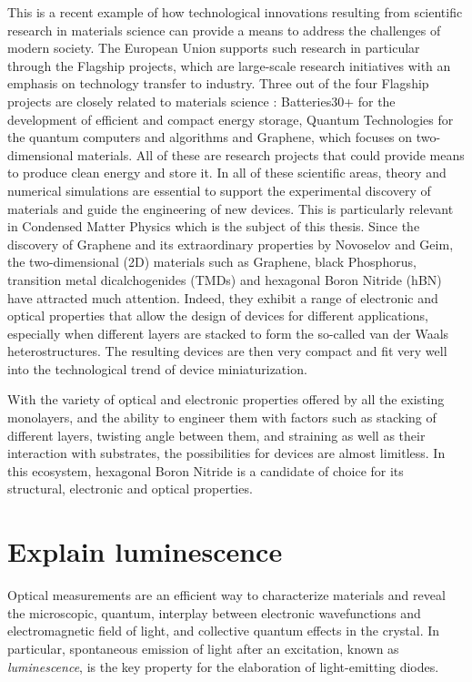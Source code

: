 This is a recent example of how technological innovations resulting from scientific research in materials science can provide a means to address the challenges of modern society. The European Union supports such research in particular through the Flagship projects, which are large-scale research initiatives with an emphasis on technology transfer to industry. Three out of the four Flagship projects are closely related to materials science : Batteries30+ for the development of efficient and compact energy storage,\cite{batteries_flagship} Quantum Technologies\cite{quantum_flagship} for the quantum computers and algorithms and Graphene,\cite{graphene_flagship} which focuses on two-dimensional materials. All of these are research projects that could provide means to produce clean energy and store it. In all of these scientific areas, theory and numerical simulations are essential to support the experimental discovery of materials and guide the engineering of new devices. This is particularly relevant in Condensed Matter Physics which is the subject of this thesis. Since the discovery of Graphene and its extraordinary properties by Novoselov and Geim,\cite{novoselov2004electric} the two-dimensional (2D) materials such as Graphene, black Phosphorus, transition metal dicalchogenides (TMDs) and hexagonal Boron Nitride (hBN) have attracted much attention. Indeed, they exhibit a range of electronic and optical properties that allow the design of devices for different applications, especially when different layers are stacked to form the so-called van der Waals heterostructures.\cite{geim2013van} The resulting devices are then very compact and fit very well into the technological trend of device miniaturization.

With the variety of optical and electronic properties offered by all the existing monolayers, and the ability to engineer them with factors such as stacking of different layers,\cite{sponza2018direct} twisting angle between them,\cite{latil2023structural, impellizzeri2022electronic} and straining\cite{blundo2021strain} as well as their interaction with substrates, the possibilities for devices are almost limitless. In this ecosystem, hexagonal Boron Nitride is a candidate of choice for its structural, electronic and optical properties.

% 


\section{Explain luminescence}
%
%					
%
%
%
Optical measurements are an efficient way to characterize materials and reveal the microscopic, quantum, interplay between electronic wavefunctions and electromagnetic field of light, and collective quantum effects in the crystal.\cite{dressel2002electrodynamics} In particular, spontaneous emission of light after an excitation, known as \textit{luminescence}, is the key property for the elaboration of light-emitting diodes. 

